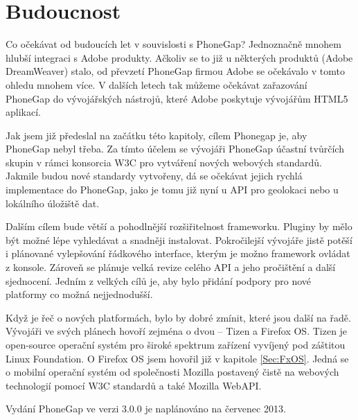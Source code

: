 \section{Budoucnost}
Co očekávat od budoucích let v souvislosti s PhoneGap? Jednoznačně mnohem hlubší integraci s Adobe produkty. Ačkoliv se to již u některých produktů (Adobe DreamWeaver) stalo, od převzetí PhoneGap firmou Adobe se očekávalo v tomto ohledu mnohem více. V dalších letech tak můžeme očekávat zařazování PhoneGap do vývojářských nástrojů, které Adobe poskytuje vývojářům HTML5 aplikací.

Jak jsem již předeslal na začátku této kapitoly, cílem Phonegap je, aby PhoneGap nebyl třeba. Za tímto účelem se vývojáři PhoneGap účastní tvůrčích skupin v rámci konsorcia W3C pro vytváření nových webových standardů. Jakmile budou nové standardy vytvořeny, dá se očekávat jejich rychlá implementace do PhoneGap, jako je tomu již nyní u API pro geolokaci nebo u lokálního úložiště dat.

Dalším cílem bude větší a pohodlnější rozšiřitelnost frameworku. Pluginy by mělo být možné lépe vyhledávat a snadněji instalovat. Pokročilejší vývojáře jistě potěší i plánované vylepšování řádkového interface, kterým je možno framework ovládat z konsole. Zároveň se plánuje velká revize celého API a jeho pročištění a další sjednocení. Jedním z velkých cílů je, aby bylo přidání podpory pro nové platformy co možná nejjednodušší.

Když je řeč o nových platformách, bylo by dobré zmínit, které jsou další na řadě. Vývojáři ve svých plánech hovoří zejména o dvou – Tizen a Firefox OS. Tizen je open-source operační systém pro široké spektrum zařízení vyvíjený pod záštitou Linux Foundation. O Firefox OS jsem hovořil již v kapitole \ref{Sec:FxOS}. Jedná se o mobilní operační systém od společnosti Mozilla postavený čistě na webových technologií pomocí W3C standardů a také Mozilla WebAPI.

Vydání PhoneGap ve verzi 3.0.0 je naplánováno na červenec 2013. \cite{cordova_roadmapprojects}